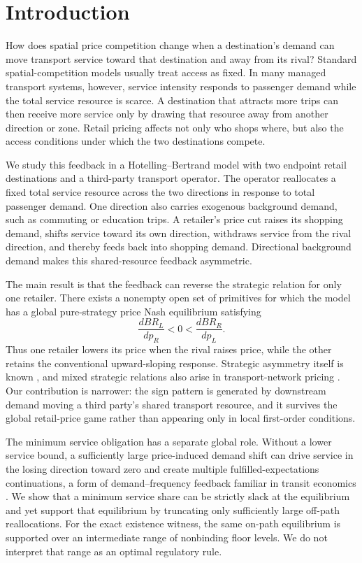 \section{Introduction}\label{sec:introduction}

How does spatial price competition change when a destination's demand can move transport service toward that destination and away from its rival? Standard spatial-competition models usually treat access as fixed. In many managed transport systems, however, service intensity responds to passenger demand while the total service resource is scarce. A destination that attracts more trips can then receive more service only by drawing that resource away from another direction or zone. Retail pricing affects not only who shops where, but also the access conditions under which the two destinations compete.

We study this feedback in a Hotelling--Bertrand model with two endpoint retail destinations and a third-party transport operator. The operator reallocates a fixed total service resource across the two directions in response to total passenger demand. One direction also carries exogenous background demand, such as commuting or education trips. A retailer's price cut raises its shopping demand, shifts service toward its own direction, withdraws service from the rival direction, and thereby feeds back into shopping demand. Directional background demand makes this shared-resource feedback asymmetric.

The main result is that the feedback can reverse the strategic relation for only one retailer. There exists a nonempty open set of primitives for which the model has a global pure-strategy price Nash equilibrium satisfying
\begin{equation*}
\frac{dBR_L}{dp_R}<0<\frac{dBR_R}{dp_L}.
\end{equation*}
Thus one retailer lowers its price when the rival raises price, while the other retains the conventional upward-sloping response. Strategic asymmetry itself is known \citep{tombak2006}, and mixed strategic relations also arise in transport-network pricing \citep{mchardy2024}. Our contribution is narrower: the sign pattern is generated by downstream demand moving a third party's shared transport resource, and it survives the global retail-price game rather than appearing only in local first-order conditions.

The minimum service obligation has a separate global role. Without a lower service bound, a sufficiently large price-induced demand shift can drive service in the losing direction toward zero and create multiple fulfilled-expectations continuations, a form of demand--frequency feedback familiar in transit economics \citep{baryosef2013}. We show that a minimum service share can be strictly slack at the equilibrium and yet support that equilibrium by truncating only sufficiently large off-path reallocations. For the exact existence witness, the same on-path equilibrium is supported over an intermediate range of nonbinding floor levels. We do not interpret that range as an optimal regulatory rule.

